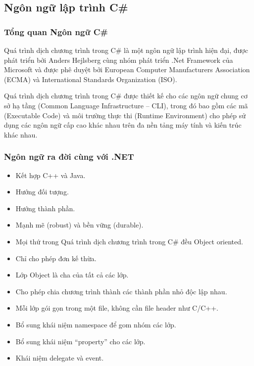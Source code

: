 \subsection*{Ngôn ngữ lập trình C\# }
\subsubsection*{Tổng quan Ngôn ngữ C\# }
Quá trình dịch chương trình trong C\# là một ngôn ngữ lập trình hiện đại, được phát triển bởi Anders Hejlsberg cùng nhóm phát triển .Net Framework của Microsoft và được phê duyệt bởi European Computer Manufacturers Association (ECMA) và International Standards Organization (ISO).

Quá trình dịch chương trình trong C\#  được thiết kế cho các ngôn ngữ chung cơ sở hạ tầng (Common Language Infrastructure – CLI), trong đó bao gồm các mã (Executable Code) và môi trường thực thi (Runtime Environment) cho phép sử dụng các ngôn ngữ cấp cao khác nhau trên đa nền tảng máy tính và kiến trúc khác nhau.

\subsubsection*{Ngôn ngữ ra đời cùng với .NET}
\begin{itemize}
	\item Kết hợp C++ và Java.
	\item Hướng đối tượng.
	\item Hướng thành phần.
	\item Mạnh mẽ (robust) và bền vững (durable).
	\item Mọi thứ trong Quá trình dịch chương trình trong C\#  đều Object oriented.
	\item Chỉ cho phép đơn kế thừa.
	\item Lớp Object là cha của tất cả các lớp.
	\item Cho phép chia chương trình thành các thành phần nhỏ độc lập nhau.
	\item Mỗi lớp gói gọn trong một file, không cần file header như C/C++.
	\item Bổ sung khái niệm namespace để gom nhóm các lớp.
	\item Bổ sung khái niệm “property” cho các lớp.
	\item Khái niệm delegate và event.
\end{itemize}

